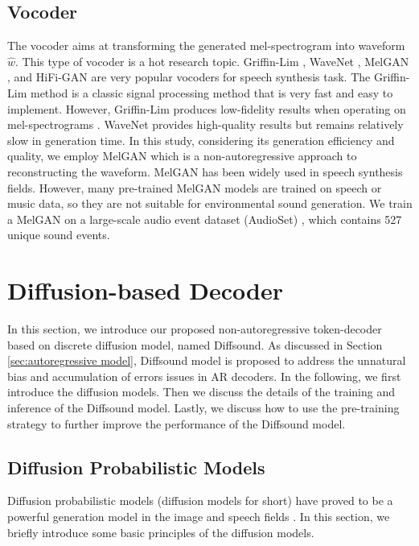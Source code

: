 \documentclass[lettersize,journal]{IEEEtran}
\begin{document}
\subsection{Vocoder}
The vocoder aims at transforming the generated mel-spectrogram into waveform $\hat{w}$. This type of vocoder is a hot research topic. Griffin-Lim \cite{griffin1984signal}, WaveNet \cite{oord2016wavenet}, MelGAN \cite{kumar2019melgan}, and HiFi-GAN \cite{kong2020hifi} are very popular vocoders for speech synthesis task. The Griffin-Lim method is a classic signal processing method that is very fast and easy to implement. However, Griffin-Lim produces low-fidelity results when operating on mel-spectrograms \cite{iashin2021taming}. WaveNet provides high-quality results but remains relatively slow in generation time. In this study, considering its generation efficiency and quality, we employ MelGAN which is a non-autoregressive approach to reconstructing the waveform. MelGAN has been widely used in speech synthesis fields. However, many pre-trained MelGAN models are trained on speech or music data, so they are not suitable for environmental sound generation. We train a MelGAN on a large-scale audio event dataset (AudioSet) \cite{gemmeke2017audio}, which contains 527 unique sound events.
\section{Diffusion-based Decoder} \label{sec:diff-decoder}
In this section, we introduce our proposed non-autoregressive token-decoder based on discrete diffusion model, named Diffsound. As discussed in Section \ref{sec:autoregressive model}, Diffsound model is proposed to address the unnatural bias and accumulation of errors issues in AR decoders. In the following, we first introduce the diffusion models. Then we discuss the details of the training and inference of the Diffsound model. Lastly, we discuss how to use the pre-training strategy to further improve the performance of the Diffsound model.
\subsection{Diffusion Probabilistic Models} \label{sec:dpm}
Diffusion probabilistic models (diffusion models for short) \cite{sohl2015deep} have proved to be a powerful generation model in the image and speech fields \cite{dhariwal2021diffusion,gu2021vector}. In this section, we briefly introduce some basic principles of the diffusion models.
\end{document}
